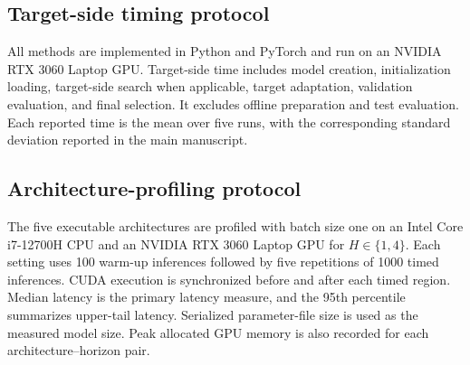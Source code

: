 \documentclass[11pt,a4paper]{article}
\begin{document}
\subsection{Target-side timing protocol}

All methods are implemented in Python and PyTorch and run on an NVIDIA RTX
3060 Laptop GPU. Target-side time includes model creation, initialization
loading, target-side search when applicable, target adaptation, validation
evaluation, and final selection. It excludes offline preparation and test
evaluation. Each reported time is the mean over five runs, with the
corresponding standard deviation reported in the main manuscript.

\subsection{Architecture-profiling protocol}

The five executable architectures are profiled with batch size one on an
Intel Core i7-12700H CPU and an NVIDIA RTX 3060 Laptop GPU for
$H\in\{1,4\}$. Each setting uses 100 warm-up inferences followed by five
repetitions of 1000 timed inferences. CUDA execution is synchronized before
and after each timed region. Median latency is the primary latency measure,
and the 95th percentile summarizes upper-tail latency. Serialized
parameter-file size is used as the measured model size. Peak allocated GPU
memory is also recorded for each architecture--horizon pair.
\end{document}

